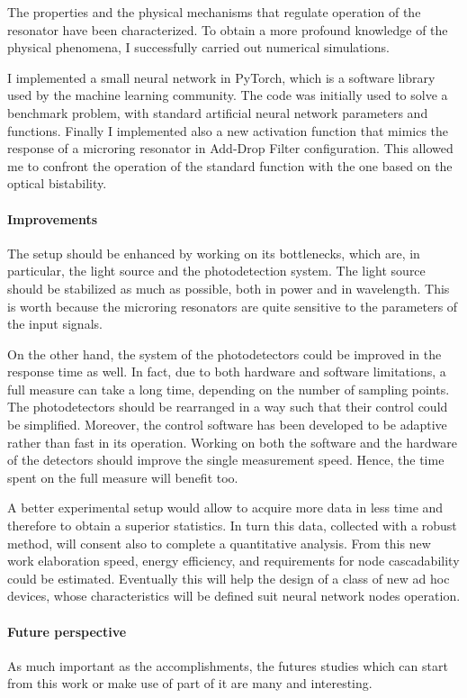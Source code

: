 The properties and the physical mechanisms that regulate operation of the resonator have been characterized.
To obtain a more profound knowledge of the physical phenomena, I successfully carried out numerical simulations.

I implemented a small neural network in PyTorch, which is a software library used by the machine learning community.
The code was initially used to solve a benchmark problem, with standard artificial neural network parameters and functions.
Finally I implemented also a new activation function that mimics the response of a microring resonator in Add-Drop Filter configuration.
This allowed me to confront the operation of the standard function with the one based on the optical bistability.

\paragraph{Improvements\\}
The setup should be enhanced by working on its bottlenecks, which are, in particular, the light source and the photodetection system.
The light source should be stabilized as much as possible, both in power and in wavelength.
This is worth because the microring resonators are quite sensitive to the parameters of the input signals.

On the other hand, the system of the photodetectors could be improved in the response time as well.
In fact, due to both hardware and software limitations, a full measure can take a long time, depending on the number of sampling points.
The photodetectors should be rearranged in a way such that their control could be simplified.
Moreover, the control software has been developed to be adaptive rather than fast in its operation.
Working on both the software and the hardware of the detectors should improve the single measurement speed.
Hence, the time spent on the full measure will benefit too.

A better experimental setup would allow to acquire more data in less time and therefore to obtain a superior statistics.
In turn this data, collected with a robust method, will consent also to complete a quantitative analysis.
From this new work elaboration speed, energy efficiency, and requirements for node cascadability could be estimated.
Eventually this will help the design of a class of new ad hoc devices, whose characteristics will be defined suit neural network nodes operation.

\paragraph{Future perspective\\}
As much important as the accomplishments, the futures studies which can start from this work or make use of part of it are many and interesting.

